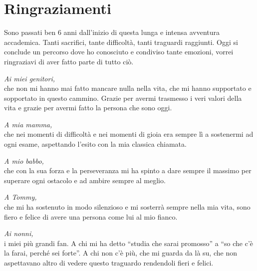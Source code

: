 \documentclass[twoside]{article}
\begin{document}
\newpage
{}
\section*{\LARGE Ringraziamenti}

\vspace{\baselineskip}


Sono passati ben 6 anni dall’inizio di questa lunga e intensa avventura accademica. Tanti sacrifici, tante difficoltà, tanti traguardi raggiunti. Oggi si conclude un percorso dove ho conosciuto e condiviso tante emozioni, vorrei ringraziavi di aver fatto parte di tutto ciò. 

\vspace{\baselineskip}

\textit{Ai miei genitori,}\\
che non mi hanno mai fatto mancare nulla nella vita, che mi hanno supportato e sopportato in questo cammino. Grazie per avermi trasmesso i veri valori della vita e grazie per avermi fatto la persona che sono oggi.
\vspace{\baselineskip}

\textit{A mia mamma,}\\
che nei momenti di difficoltà e nei momenti di gioia era sempre lì a sostenermi ad ogni esame, aspettando l’esito con la mia classica chiamata. 

\vspace{\baselineskip}

\textit{A mio babbo,}\\
che con la sua forza e la perseveranza mi ha spinto a dare sempre il massimo per superare ogni ostacolo e ad ambire sempre al meglio. 

\vspace{\baselineskip}

\textit{A Tommy,}\\
che mi ha sostenuto in modo silenzioso e mi sosterrà sempre nella mia vita, sono fiero e felice di avere una persona come lui al mio fianco.

\vspace{\baselineskip}

\textit{Ai nonni,}\\
i miei più grandi fan. A chi mi ha detto “studia che sarai promosso” a “so che c’è la farai, perché sei forte”. A chi non c’è più, che mi guarda da là su, che non aspettavano altro di vedere questo traguardo rendendoli fieri e felici.
 
\end{document}
